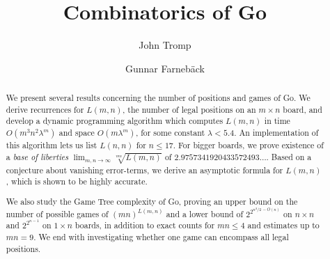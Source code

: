 \documentclass{article}
\begin{document}
\newtheorem{theorem}{\sc Theorem}
\newtheorem{lemma}{\sc Lemma}
\newtheorem{coro}{\sc Corollary}
\newtheorem{conj}{\sc Conjecture}
\newtheorem{defin}{\sc Definition}
\newenvironment{proof}{\par \sc Proof.\rm}{\hspace*{\fill}$\bullet$\vspace{1ex}}
\newcommand{\BFL}{\mathbf{L}}
\newcommand{\BFl}{\mathbf{l}}
\newcommand{\BFp}{\mathbf{p}}
\newcommand{\BFT}{\mathbf{T}}

\title{Combinatorics of Go}

\author{John Tromp \and Gunnar Farneb\"{a}ck}

\maketitle

\begin{abstract}
We present several results concerning
the number of positions and games of Go.
We derive recurrences for $L(m,n)$,
the number of legal positions on an $m \times n$ board,
and develop a dynamic programming algorithm which computes
$L(m,n)$ in time $O(m^3 n^2 \lambda^m)$ and space $O(m \lambda^m)$,
for some constant $\lambda < 5.4$.
An implementation of this algorithm lets us list $L(n,n)$ for $n\leq 17$.
For bigger boards, we prove existence of a
{\em base of liberties} $\lim_{m,n \rightarrow \infty} \sqrt[mn]{L(m,n)}$ of
$2.9757341920433572493\ldots$.
Based on a conjecture about vanishing error-terms,
we derive an asymptotic formula for $L(m,n)$,
which is shown to be highly accurate.

We also study the Game Tree complexity of Go,
proving an upper bound on the number of possible games
of $(mn)^{L(m,n)}$ and a lower bound
of $2^{2^{n^2/2\,-O(n)}}$ on $n\times n$ and $2^{2^{n-1}}$
on $1 \times n$ boards, in addition to
exact counts for $mn \leq 4$ and estimates up to $mn=9$.
We end with investigating whether one game can encompass all legal positions.
\end{abstract}
\end{document}
